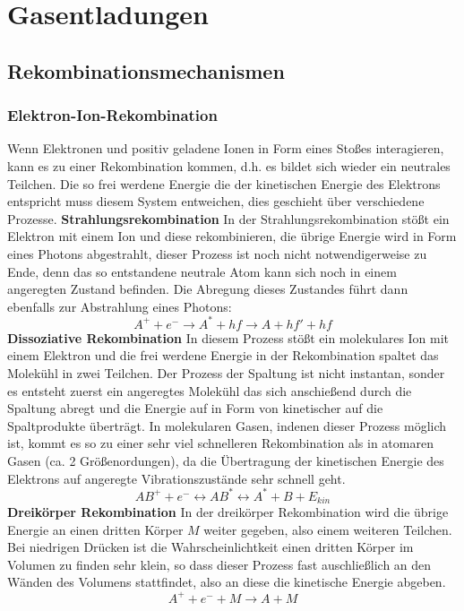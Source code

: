 \section{Gasentladungen}
\label{sec:gasdischarges}

\subsection{Rekombinationsmechanismen}
\subsubsection{Elektron-Ion-Rekombination}
Wenn Elektronen und positiv geladene Ionen in Form eines Stoßes interagieren, kann es zu einer Rekombination kommen, d.h. es bildet sich wieder ein neutrales Teilchen. Die so frei werdene Energie die der kinetischen Energie des Elektrons entspricht muss diesem System entweichen, dies geschieht über verschiedene Prozesse.\newline\newline
\textbf{Strahlungsrekombination}
In der Strahlungsrekombination stößt ein Elektron mit einem Ion und diese rekombinieren, die übrige Energie wird in Form eines Photons abgestrahlt, dieser Prozess ist noch nicht notwendigerweise zu Ende, denn das so entstandene neutrale Atom kann sich noch in einem angeregten Zustand befinden. Die Abregung dieses Zustandes führt dann ebenfalls zur Abstrahlung eines Photons:
\begin{equation}
    A^+ + e^- \rightarrow A^* + hf \rightarrow A + hf' + hf
    \label{eq:radiationrecombination}
\end{equation}\newline
\textbf{Dissoziative Rekombination}
In diesem Prozess stößt ein molekulares Ion mit einem Elektron und die frei werdene Energie in der Rekombination spaltet das Molekühl in zwei Teilchen. Der Prozess der Spaltung ist nicht instantan, sonder es entsteht zuerst ein angeregtes Molekühl das sich anschießend durch die Spaltung abregt und die Energie auf in Form von kinetischer auf die Spaltprodukte überträgt. In molekularen Gasen, indenen dieser Prozess möglich ist, kommt es so zu einer sehr viel schnelleren Rekombination als in atomaren Gasen (ca. 2 Größenordungen), da die Übertragung der kinetischen Energie des Elektrons auf angeregte Vibrationszustände sehr schnell geht.
\begin{equation}
    AB^+ + e^- \leftrightarrow AB^* \leftrightarrow A^* + B + E_{kin}
\end{equation}\newline
\textbf{Dreikörper Rekombination}
In der dreikörper Rekombination wird die übrige Energie an einen dritten Körper \(M\) weiter gegeben, also einem weiteren Teilchen. Bei niedrigen Drücken ist die Wahrscheinlichtkeit einen dritten Körper im Volumen zu finden sehr klein, so dass dieser Prozess fast auschließlich an den Wänden des Volumens stattfindet, also an diese die kinetische Energie abgeben.
\begin{equation}
    A^+ + e^- + M \rightarrow A + M
\end{equation}

